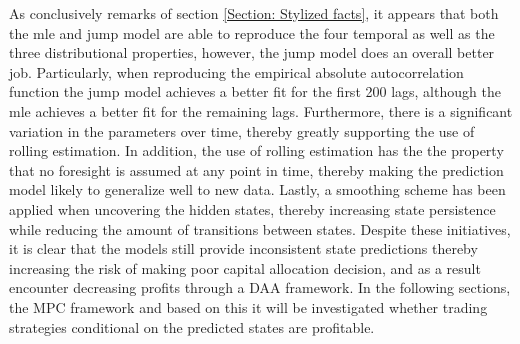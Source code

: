 As conclusively remarks of section \ref{Section: Stylized facts}, it appears that both the mle and jump model are able to reproduce the four temporal as well as the three distributional properties, however, the jump model does an overall better job. Particularly, when reproducing the empirical absolute autocorrelation function the jump model achieves a better fit for the first 200 lags, although the mle achieves a better fit for the remaining lags. Furthermore, there is a significant variation in the parameters over time, thereby greatly supporting the use of rolling estimation. In addition, the use of rolling estimation has the the property that no foresight is assumed at any point in time, thereby making the prediction model likely to generalize well to new data. Lastly, a smoothing scheme has been applied when uncovering the hidden states, thereby increasing state persistence while reducing the amount of transitions between states. Despite these initiatives, it is clear that the models still provide inconsistent state predictions thereby increasing the risk of making poor capital allocation decision, and as a result encounter decreasing profits through a DAA framework. In the following sections, the MPC framework and based on this it will be investigated whether trading strategies conditional on the predicted states are profitable.

